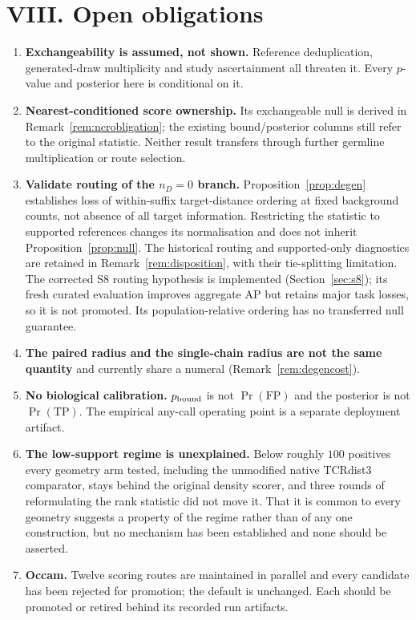 \documentclass[10pt,a4paper]{article}
\theoremstyle{definition}
\begin{document}
\part*{VIII. Open obligations}

\begin{enumerate}\setlength{\itemsep}{1pt}
\item \textbf{Exchangeability is assumed, not shown.} Reference deduplication, generated-draw
  multiplicity and study ascertainment all threaten it. Every $p$-value and posterior here is
  conditional on it.
\item \textbf{Nearest-conditioned score ownership.} Its exchangeable null is derived in
  Remark~\ref{rem:ncrobligation}; the existing bound/posterior columns still refer to the original
  statistic. Neither result transfers through further germline multiplication or route selection.
\item \textbf{Validate routing of the $n_D=0$ branch.} Proposition~\ref{prop:degen} establishes
  loss of within-suffix target-distance ordering at fixed background counts, not absence of all
  target information. Restricting the statistic to supported references changes its normalisation
  and does not inherit Proposition~\ref{prop:null}. The historical routing and supported-only
  diagnostics are retained in Remark~\ref{rem:disposition}, with their tie-splitting limitation.
  The corrected S8 routing hypothesis is implemented (Section~\ref{sec:s8}); its fresh curated
  evaluation improves aggregate AP but retains major task losses, so it is not promoted. Its population-relative ordering has no transferred null guarantee.
\item \textbf{The paired radius and the single-chain radius are not the same quantity} and currently
  share a numeral (Remark~\ref{rem:degencost}).
\item \textbf{No biological calibration.} $p_{\rm bound}$ is not $\Pr(\text{FP})$ and the posterior
  is not $\Pr(\text{TP})$. The empirical any-call operating point is a separate deployment artifact.
\item \textbf{The low-support regime is unexplained.} Below roughly $100$ positives every
  geometry arm tested, including the unmodified native TCRdist3 comparator, stays behind the
  original density scorer, and three rounds of reformulating the rank statistic did not move it.
  That it is common to every geometry suggests a property of the regime rather than of any one
  construction, but no mechanism has been established and none should be asserted.
\item \textbf{Occam.} Twelve scoring routes are maintained in parallel and every candidate has been
  rejected for promotion; the default is unchanged. Each should be promoted or retired behind its
  recorded run artifacts.
\end{enumerate}
\end{document}

